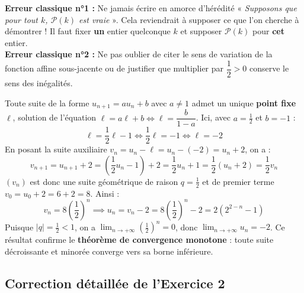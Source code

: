 \documentclass[11pt,a4paper]{article}
\begin{document}
\begin{vigilancebox}
\textbf{Erreur classique n°1 :} Ne jamais écrire en amorce d'hérédité « \emph{Supposons que pour tout $k$, $\mathcal{P}(k)$ est vraie} ». Cela reviendrait à supposer ce que l'on cherche à démontrer ! Il faut fixer \textbf{un} entier quelconque $k$ et supposer $\mathcal{P}(k)$ pour \textbf{cet} entier.\\
\textbf{Erreur classique n°2 :} Ne pas oublier de citer le sens de variation de la fonction affine sous-jacente ou de justifier que multiplier par $\dfrac{1}{2} > 0$ conserve le sens des inégalités.
\end{vigilancebox}

\begin{prolongementbox}
Toute suite de la forme $u_{n+1} = a u_n + b$ avec $a \neq 1$ admet un unique \textbf{point fixe} $\ell$, solution de l'équation $\ell = a \ell + b \iff \ell = \dfrac{b}{1-a}$.
Ici, avec $a = \frac{1}{2}$ et $b = -1$ :
\[
\ell = \frac{1}{2}\ell - 1 \iff \frac{1}{2}\ell = -1 \iff \ell = -2
\]
En posant la suite auxiliaire $v_n = u_n - \ell = u_n - (-2) = u_n + 2$, on a :
\[
v_{n+1} = u_{n+1} + 2 = \left(\frac{1}{2}u_n - 1\right) + 2 = \frac{1}{2}u_n + 1 = \frac{1}{2}(u_n + 2) = \frac{1}{2}v_n
\]
$(v_n)$ est donc une suite géométrique de raison $q = \frac{1}{2}$ et de premier terme $v_0 = u_0 + 2 = 6 + 2 = 8$.
Ainsi :
\[
v_n = 8 \left(\frac{1}{2}\right)^n \implies u_n = v_n - 2 = 8 \left(\frac{1}{2}\right)^n - 2 = 2\left(2^{2-n} - 1\right)
\]
Puisque $|q| = \frac{1}{2} < 1$, on a $\lim_{n \to +\infty} \left(\frac{1}{2}\right)^n = 0$, donc $\lim_{n \to +\infty} u_n = -2$.
Ce résultat confirme le \textbf{théorème de convergence monotone} : toute suite décroissante et minorée converge vers sa borne inférieure.
\end{prolongementbox}

\vspace{0.3cm}

\subsection*{Correction détaillée de l'Exercice 2}
\end{document}
